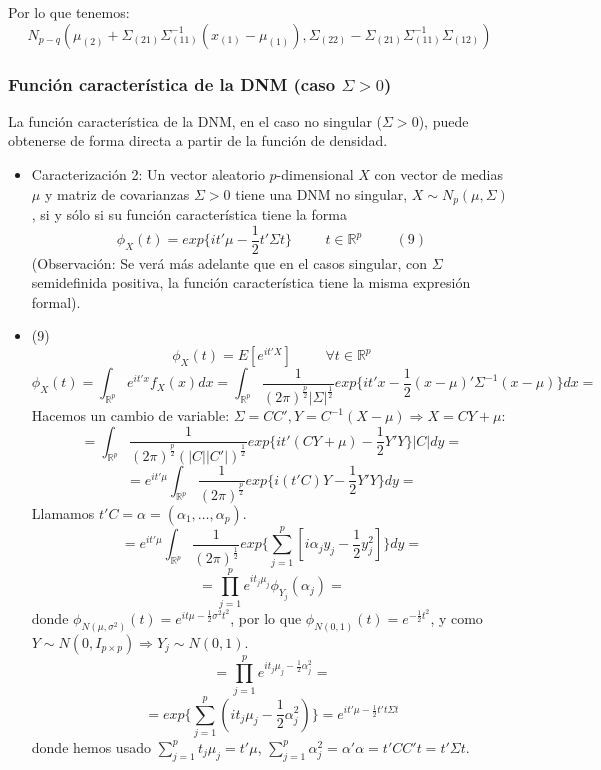 \documentclass[11pt,a4paper]{article}
\begin{document}
\begin{itemize}
\begin{itemize}
Por lo que tenemos:
$$N_{p-q} (\mu_{(2)} + \Sigma_{(21)} \Sigma_{(11)}^{-1}(x_{(1)} - \mu_{(1)}), \Sigma_{(22)} - \Sigma_{(21)} \Sigma_{(11)}^{-1} \Sigma_{(12)})$$
\end{itemize}
\end{itemize}

\subsubsection{Función característica de la DNM (caso \texorpdfstring{$\Sigma > 0$}))}
La función característica de la DNM, en el caso no singular ($\Sigma > 0$), puede obtenerse de forma directa a partir de la función de densidad.

\begin{itemize}
\item Caracterización 2: Un vector aleatorio $p$-dimensional $X$ con vector de medias $\mu$ y matriz de covarianzas $\Sigma > 0$ tiene una DNM no singular, $X \sim N_{p}(\mu, \Sigma)$, si y sólo si su función característica tiene la forma
$$\phi_{X}(t) = exp\{it'\mu - \frac{1}{2}t'\Sigma t\} \hspace{1cm} t \in \mathbb{R}^{p} \hspace{1cm} (9)$$
(Observación: Se verá más adelante que en el casos singular, con $\Sigma$ semidefinida positiva, la función característica tiene la misma expresión formal).

\item (9) $$\phi_{X}(t) = E[e^{it'X}] \hspace{1cm} \forall t \in \mathbb{R}^{p}$$
$$\phi_{X}(t) = \int_{\mathbb{R}^{p}} e^{it'x} f_{X}(x)dx = \int_{\mathbb{R}^{p}} \frac{1}{(2\pi)^{\frac{p}{2}} |\Sigma|^{\frac{1}{2}}} exp\{it'x - \frac{1}{2}(x - \mu)'\Sigma^{-1}(x - \mu)\} dx =$$
Hacemos un cambio de variable: $\Sigma = CC', Y = C^{-1}(X - \mu) \Rightarrow X = CY + \mu$:
$$= \int_{\mathbb{R}^{p}} \frac{1}{(2\pi)^{\frac{p}{2}}(|C||C'|)^{\frac{1}{2}}} exp\{it'(CY + \mu) - \frac{1}{2}Y'Y\} |C| dy =$$
$$= e^{it'\mu} \int_{\mathbb{R}^{p}} \frac{1}{(2\pi)^{\frac{p}{2}}} exp\{i(t'C)Y - \frac{1}{2}Y'Y\} dy =$$
Llamamos $t'C = \alpha = (\alpha_{1}, \dots, \alpha_{p})$.
$$= e^{it'\mu} \int_{\mathbb{R}^{p}} \frac{1}{(2\pi)^{\frac{1}{2}}} exp\{\sum_{j=1}^{p}[i \alpha_{j} y_{j} - \frac{1}{2}y_{j}^{2}]\} dy =$$
$$= \prod_{j=1}^{p} e^{it_{j}\mu_{j}} \phi_{Y_{j}}(\alpha_{j}) =$$
donde $\phi_{N(\mu, \sigma^{2})}(t) = e^{it\mu - \frac{1}{2}\sigma^{2}t^{2}}$, por lo que $\phi_{N(0, 1)}(t) = e^{-\frac{1}{2}t^{2}}$, y como $Y \sim N(0, I_{p \times p}) \Rightarrow Y_{j} \sim N(0,1)$.
$$= \prod_{j=1}^{p} e^{it_{j}\mu_{j} - \frac{1}{2} \alpha_{j}^{2}} =$$
$$= exp\{\sum_{j=1}^{p} (it_{j}\mu_{j} - \frac{1}{2} \alpha_{j}^{2})\} = e^{it'\mu - \frac{1}{2}t't\Sigma t}$$
donde hemos usado $\sum_{j=1}^{p} t_{j}\mu_{j} = t'\mu$, $\sum_{j=1}^{p} \alpha_{j}^{2} = \alpha'\alpha = t'CC't = t' \Sigma t$.


\end{itemize}
\end{document}
